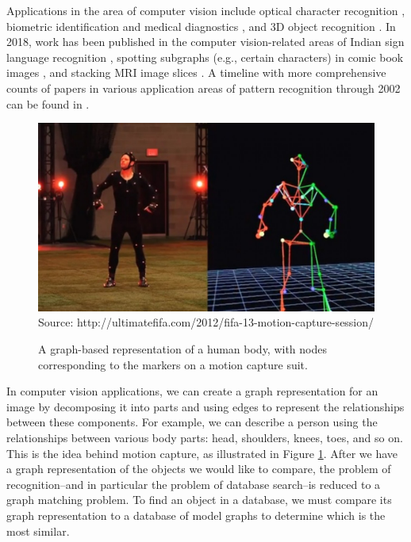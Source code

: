 \documentclass[12pt]{thesis}
\theoremstyle{plain}
\theoremstyle{definition}
\theoremstyle{remark}
\begin{document}
Applications in the area of computer vision include optical character recognition \cite{Lu_1991,Rocha_1994}, biometric identification \cite{isenor1986fingerprint,deng2010retinal} and medical diagnostics \cite{sharma2012determining}, and 3D object recognition \cite{Christmas_1995}. In 2018, work has been published in the computer vision-related areas of Indian sign language recognition \cite{Kumar_2018a,Kumar_2018b}, spotting subgraphs (e.g., certain characters) in comic book images \cite{le2018ssgci}, and stacking MRI image slices \cite{clough2018mri}. A timeline with more comprehensive counts of papers in various application areas of pattern recognition through 2002 can be found in \cite{Conte_2004}.

\begin{figure}[t!]
\centering
\includegraphics[width=\textwidth]{motion_capture_demo.png}
\scriptsize Source: http://ultimatefifa.com/2012/fifa-13-motion-capture-session/
\caption{A graph-based representation of a human body, with nodes corresponding to the markers on a motion capture suit.}
\label{motion_capture_demo}
\end{figure}

In computer vision applications, we can create a graph representation for an image by decomposing it into parts and using edges to represent the relationships between these components. For example, we can describe a person using the relationships between various body parts: head, shoulders, knees, toes, and so on. This is the idea behind motion capture, as illustrated in Figure \ref{motion_capture_demo}. After we have a graph representation of the objects we would like to compare, the problem of recognition--and in particular the problem of database search--is reduced to a graph matching problem. To find an object in a database, we must compare its graph representation to a database of model graphs to determine which is the most similar.
\end{document}
